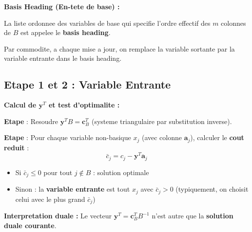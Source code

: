 \documentclass[12pt,a4paper]{article}
\newcommand*\circled[1]{\tikz[baseline=(char.base)]{\node[shape=circle,draw,inner sep=2pt] (char) {#1};}}
\begin{document}
\begin{definition}
\textbf{Basis Heading (En-tete de base) :}

La liste ordonnee des variables de base qui specifie l'ordre effectif des $m$ colonnes de $B$ est appelee le \textcolor{algoviolet}{\textbf{basis heading}}.

Par commodite, a chaque mise a jour, on remplace la variable sortante par la variable entrante dans le basis heading.
\end{definition}

\newpage
\subsection{Etape 1 et 2 : Variable Entrante}

\begin{methode}
\textbf{Calcul de $\mathbf{y}^T$ et test d'optimalite :}

\textbf{Etape \circled{1}} : Resoudre $\mathbf{y}^T B = \mathbf{c}_B^T$ (systeme triangulaire par substitution inverse).

\textbf{Etape \circled{2}} : Pour chaque variable non-basique $x_j$ (avec colonne $\mathbf{a}_j$), calculer le \textcolor{algoviolet}{\textbf{cout reduit}} :
$$\bar{c}_j = c_j - \mathbf{y}^T \mathbf{a}_j$$

\begin{itemize}
    \item Si $\bar{c}_j \leq 0$ pour tout $j \notin B$ : solution optimale
    \item Sinon : la \textcolor{defvert}{\textbf{variable entrante}} est tout $x_j$ avec $\bar{c}_j > 0$ (typiquement, on choisit celui avec le plus grand $\bar{c}_j$)
\end{itemize}

\textbf{Interpretation duale :} Le vecteur $\mathbf{y}^T = \mathbf{c}_B^T B^{-1}$ n'est autre que la \textcolor{importantrouge}{\textbf{solution duale courante}}.
\end{methode}
\end{document}
